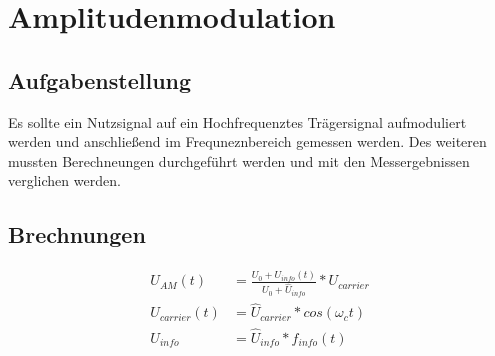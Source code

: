 \section{Amplitudenmodulation}
\subsection{Aufgabenstellung}
Es sollte ein Nutzsignal auf ein Hochfrequenztes Tr\"agersignal aufmoduliert werden und anschlie\ss{}end im Frequneznbereich gemessen werden. Des weiteren mussten Berechneungen durchgef\"uhrt werden und mit den Messergebnissen verglichen werden.

\subsection{Brechnungen}
\begin{center}
  \begin{align*}
    U_{AM}(t) &= \frac{U_0 + U_{info}(t)}{U_0 + \hat{U}_{info}} * U_{carrier}\\
    U_{carrier}(t) &= \hat{U}_{carrier} * cos(\omega_c t)\\
    U_{info} &= \hat{U}_{info} * f_{info}(t)
  \end{align*}
\end{center}
